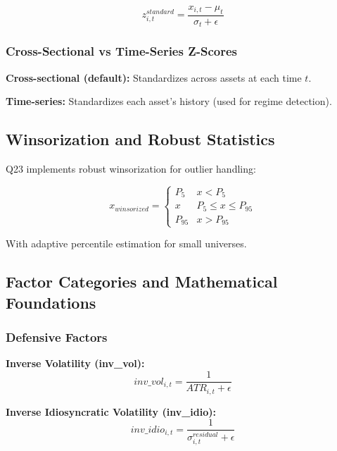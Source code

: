\documentclass[11pt,letterpaper]{book}
\begin{document}
\begin{equation}
z_{i,t}^{standard} = \frac{x_{i,t} - \mu_t}{\sigma_t + \epsilon}
\end{equation}

\subsubsection{Cross-Sectional vs Time-Series Z-Scores}

\textbf{Cross-sectional (default):} Standardizes across assets at each time $t$.

\textbf{Time-series:} Standardizes each asset's history (used for regime detection).

\subsection{Winsorization and Robust Statistics}

Q23 implements robust winsorization for outlier handling:

\begin{equation}
x_{winsorized} = \begin{cases}
    P_5 & x < P_5 \\
    x & P_5 \leq x \leq P_{95} \\
    P_{95} & x > P_{95}
\end{cases}
\end{equation}

With adaptive percentile estimation for small universes.

\subsection{Factor Categories and Mathematical Foundations}

\subsubsection{Defensive Factors}

\textbf{Inverse Volatility (inv\_vol):}
\begin{equation}
inv\_vol_{i,t} = \frac{1}{ATR_{i,t} + \epsilon}
\end{equation}

\textbf{Inverse Idiosyncratic Volatility (inv\_idio):}
\begin{equation}
inv\_idio_{i,t} = \frac{1}{\sigma_{i,t}^{residual} + \epsilon}
\end{equation}
\end{document}
